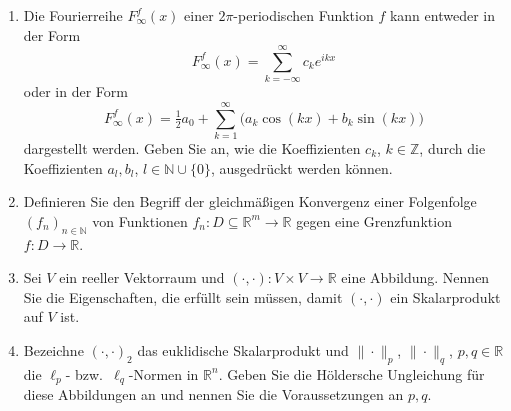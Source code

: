 \begin{enumerate}
\item Die Fourierreihe $F_{\infty}^f(x)$ einer $2\pi$-periodischen Funktion $f$ kann entweder in der Form
\[
F_{\infty}^f(x)=\sum_{k=-\infty}^{\infty} c_k e^{ikx}
\]
oder in der Form
\[
F_{\infty}^f(x)=\tfrac{1}{2}a_0+\sum_{k=1}^{\infty}\bigl(a_k\cos(kx)+b_k\sin(kx)\bigr)
\]
dargestellt werden. Geben Sie an, wie die Koeffizienten $c_k$, $k\in\mathbb{Z}$, durch die Koeffizienten $a_l,b_l$, $l\in\mathbb{N}\cup\{0\}$, ausgedrückt werden können.
\\

\item Definieren Sie den Begriff der gleichmäßigen Konvergenz einer Folgenfolge $(f_n)_{n\in\mathbb{N}}$ von Funktionen $f_n:D\subseteq\mathbb{R}^m\to\mathbb{R}$ gegen eine Grenzfunktion $f:D\to\mathbb{R}$.
\\

\item Sei $V$ ein reeller Vektorraum und $(\cdot,\cdot):V\times V\to\mathbb{R}$ eine Abbildung. Nennen Sie die Eigenschaften, die erfüllt sein müssen, damit $(\cdot,\cdot)$ ein Skalarprodukt auf $V$ ist.
\\

\item Bezeichne $(\cdot,\cdot)_2$ das euklidische Skalarprodukt und $\|\cdot\|_p$, $\|\cdot\|_q$, $p,q\in\mathbb{R}$ die $\ell_p$- bzw.\ $\ell_q$-Normen in $\mathbb{R}^n$. Geben Sie die H\"oldersche Ungleichung für diese Abbildungen an und nennen Sie die Voraussetzungen an $p,q$.
\\


\end{enumerate}
